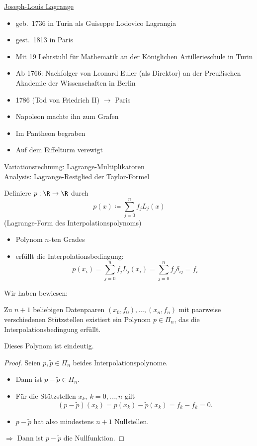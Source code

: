 \underline{Joseph-Louis Lagrange}
\begin{itemize}
 \item geb.~1736 in Turin als Guiseppe Lodovico Lagrangia
 \item gest.~1813 in Paris
 \item Mit 19 Lehrstuhl für Mathematik an der Königlichen Artillerieschule in Turin
 \item Ab 1766: Nachfolger von Leonard Euler (als Direktor) an der Preußischen Akademie der Wissenschaften in Berlin
 \item 1786 (Tod von Friedrich II) $\rightarrow$ Paris
 \item Napoleon machte ihn zum Grafen
 \item Im Pantheon begraben
 \item Auf dem Eiffelturm verewigt
\end{itemize}
Variationsrechnung: Lagrange-Multiplikatoren\\
Analysis: Lagrange-Restglied der Taylor-Formel

\bigskip

Definiere $p:\R\to\R$ durch
\begin{equation*}
 p(x) \coloneqq \sum_{j=0}^n f_j L_j(x)
\end{equation*}
(Lagrange-Form des Interpolationspolynoms)
\begin{itemize}
 \item Polynom $n$-ten Grades
 \item erfüllt die Interpolationsbedingung:
 \begin{equation*}
  p(x_i) = \sum_{j=0}^n f_jL_j(x_i) = \sum_{j=0}^n f_j \delta_{ij} = f_i
 \end{equation*}
\end{itemize}

Wir haben bewiesen:
\begin{satz}
 Zu $n+1$ beliebigen Datenpaaren $(x_0,f_0),\hdots,(x_n,f_n)$ mit paarweise verschiedenen Stützstellen existiert ein Polynom $p\in\Pi_n$, das die Interpolationsbedingung erfüllt.
\end{satz}

\begin{satz}
 Dieses Polynom ist eindeutig.
\end{satz}
\begin{proof}
 Seien $p,\tilde p\in\Pi_n$ beides Interpolationspolynome.
 \begin{itemize}
  \item Dann ist $p-\tilde p \in \Pi_n$.
  \item Für die Stützstellen $x_k,\ k=0,\hdots,n$ gilt
  \begin{equation*}
    (p-\tilde p)(x_k) = p(x_k) - \tilde p(x_k) = f_k - f_k = 0.
  \end{equation*}
  \item $p - \tilde p$ hat also mindestens $n+1$ Nullstellen.
 \end{itemize}
 $\Rightarrow$ Dann ist $p-\tilde p$ die Nullfunktion.
\end{proof}


